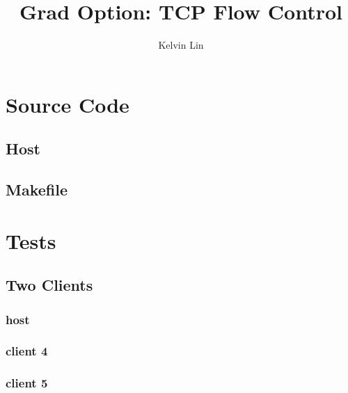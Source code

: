 \documentclass[12pt]{article}
\title{Grad Option: TCP Flow Control}
\author{Kelvin Lin}
\begin{document}
\maketitle

\section{Source Code}

\subsection{Host}


\subsection{Makefile}


\section{Tests}

\subsection{Two Clients}

\subsubsection{host}


\subsubsection{client 4}


\subsubsection{client 5}

\end{document}
